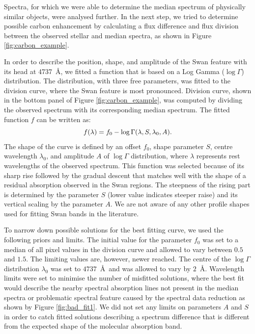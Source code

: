 Spectra, for which we were able to determine the median spectrum of physically similar objects, were analysed further. In the next step, we tried to determine possible carbon enhancement by calculating a flux difference and flux division between the observed stellar and median spectra, as shown in Figure \ref{fig:carbon_example}.

In order to describe the position, shape, and amplitude of the Swan feature with its head at 4737~\AA, we fitted a function that is based on a Log Gamma ($\log{}\Gamma$) distribution. The distribution, with three free parameters, was fitted to the division curve, where the Swan feature is most pronounced. Division curve, shown in the bottom panel of Figure \ref{fig:carbon_example}, was computed by dividing the observed spectrum with its corresponding median spectrum. The fitted function $f$ can be written as:
\begin{equation}
\centering
f(\lambda) = f_0 - \log{}\Gamma(\lambda, S, \lambda_0, A).
\label{equ:loggamma}
\end{equation}
The shape of the curve is defined by an offset $f_0$, shape parameter $S$, centre wavelength $\lambda_0$, and amplitude $A$ of $\log{}\Gamma$ distribution, where $\lambda$ represents rest wavelengths of the observed spectrum. This function was selected because of its sharp rise followed by the gradual descent that matches well with the shape of a residual absorption observed in the Swan regions. The steepness of the rising part is determined by the parameter $S$ (lower value indicates steeper raise) and its vertical scaling by the parameter $A$. We are not aware of any other profile shapes used for fitting Swan bands in the literature.

To narrow down possible solutions for the best fitting curve, we used the following priors and limits. The initial value for the parameter $f_0$ was set to a median of all pixel values in the division curve and allowed to vary between $0.5$ and $1.5$. The limiting values are, however, newer reached. The centre of the $\log{}\Gamma$ distribution $\lambda_0$ was set to $4737$~\AA\ and was allowed to vary by $2$~\AA. Wavelength limits were set to minimise the number of misfitted solutions, where the best fit would describe the nearby spectral absorption lines not present in the median spectra or problematic spectral feature caused by the spectral data reduction as shown by Figure \ref{fig:bad_fit1}. We did not set any limits on parameters $A$ and $S$ in order to catch fitted solutions describing a spectrum difference that is different from the expected shape of the molecular absorption band.

